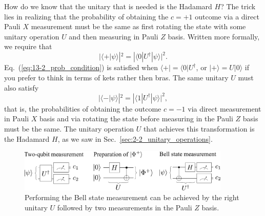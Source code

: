 How do we know that the unitary that is needed is the Hadamard $H$?
The trick lies in realizing that the probability of obtaining the $c=+1$ outcome via a direct Pauli $X$ measurement must be the same as first rotating the state with some unitary operation $U$ and then measuring in Pauli $Z$ basis.
Written more formally, we require that
\begin{equation}
    |\langle+|\psi\rangle|^2 = |\langle0|U^{\dagger}|\psi\rangle|^2.
    \label{eq:13-2_prob_condition}
\end{equation}
Eq.~(\ref{eq:13-2_prob_condition}) is satisfied when $\langle+|=\langle0|U^{\dagger}$, or $|+\rangle=U|0\rangle$ if you prefer to think in terms of kets rather then bras.
The same unitary $U$ must also satisfy
\begin{equation}
    |\langle-|\psi\rangle|^2 = |\langle1|U^{\dagger}|\psi\rangle|^2,
\end{equation}
that is, the probabilities of obtaining the outcome $c=-1$ via direct measurement in Pauli $X$ basis and via rotating the state before measuring in the Pauli $Z$ basis must be the same.
The unitary operation $U$ that achieves this transformation is the Hadamard $H$, as we saw in Sec.~\ref{sec:2-2_unitary_operations}.

\begin{figure}
    \centering
    \includegraphics[width=0.9\textwidth]{lesson13/13-2_measurementBell.pdf}
    \caption[Bell state measurement via Pauli Z measurements.]{Performing the Bell state measurement can be achieved by the right unitary $U$ followed by two measurements in the Pauli $Z$ basis.}
    \label{fig:13-2_measurementBell}
\end{figure}

